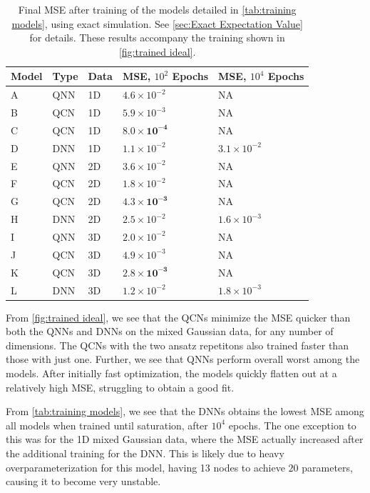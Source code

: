 \begin{table}[H]
\centering
\caption{Final MSE after training of the models detailed in \autoref{tab:training models}, using exact simulation. See \autoref{sec:Exact Expectation Value} for details. These results accompany the training shown in \autoref{fig:trained ideal}.}
\begin{tabular}{|l|l|l|l|l|}
\hline
Model& Type& Data& MSE, $10^{2}$ Epochs& MSE, $10^{4}$ Epochs \\ \hline
A    & QNN & 1D  &  $4.6\times 10^{-2}$  & NA   \\ \hline
B    & QCN & 1D  & $5.9\times 10^{-3}$  & NA \\ \hline
C    & QCN & 1D  & $\boldsymbol{8.0\times 10^{-4}}$  & NA  \\ \hline
D    & DNN & 1D  & $1.1\times 10^{-2}$ & $3.1\times 10^{-2}$  \\ \Xhline{2\arrayrulewidth}
E    & QNN & 2D  &  $3.6\times 10^{-2}$ & NA  \\ \hline
F    & QCN & 2D  &  $1.8\times 10^{-2}$ & NA  \\ \hline
G    & QCN & 2D  &  $\boldsymbol{4.3\times 10^{-3}}$ & NA  \\ \hline
H    & DNN & 2D  &  $2.5\times10^{-2}$ & $1.6\times10^{-3}$\\ 
\Xhline{2\arrayrulewidth}
I    & QNN & 3D  &  $2.0\times 10^{-2}$& NA  \\ \hline
J    & QCN & 3D  &  $4.9\times 10^{-3}$ & NA  \\ \hline
K    & QCN & 3D  &  $\boldsymbol{2.8\times10^{-3}}$  & NA  \\ \hline
L    & DNN & 3D  &  $1.2\times10^{-2}$  & $1.8\times10^{-3}$  \\ \hline
\end{tabular}
 
\label{tab:training models mse}
\end{table}

From \autoref{fig:trained ideal}, we see that the QCNs minimize the MSE quicker than both the QNNs and DNNs on the mixed Gaussian data, for any number of dimensions. The QCNs with the two ansatz repetitons also trained faster than those with just one. Further, we see that QNNs perform overall worst among the models. After initially fast optimization, the models quickly flatten out at a relatively high MSE, struggling to obtain a good fit. 

From \autoref{tab:training models}, we see that the DNNs obtains the lowest MSE among all models when trained until saturation, after $10^4$ epochs. The one exception to this was for the 1D mixed Gaussian data, where the MSE actually increased after the additional training for the DNN. This is likely due to heavy overparameterization for this model, having 13 nodes to achieve $20$ parameters, causing it to become very unstable.


